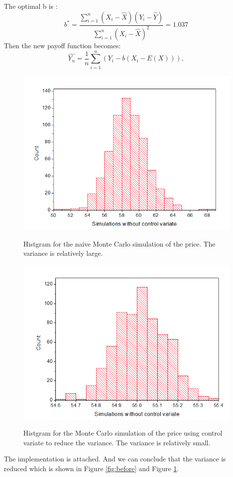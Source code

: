 \documentclass{report}
\begin{document}
The optimal b is : 
$$b^*=\frac{\sum_{i=1}^{n}(X_i-\hat{X}) (Y_i-\hat{Y}) }{\sum_{i=1}^{n}(X_i-\hat{X})^2} = 1.037 $$
Then the new payoff function becomes: 
$$\hat{Y_n}=\frac{1}{n}\sum_{i=1}^{n}(Y_i-b(X_i-E(X))), $$

\begin{figure} \centering
\includegraphics[width=\textwidth]{before}\label{fig:before}
\caption{Histgram for the naive Monte Carlo simulation of the price. The variance is relatively large.}  
\includegraphics[width=\textwidth]{after}\label{fig:after}
\caption{Histgram for the Monte Carlo simulation of the price using control variate to reduce the variance. The variance is relatively small.}  
\end{figure}
The implementation is attached. And we can conclude that the variance is reduced which is shown in Figure \ref{fig:before} and Figure \ref{fig:after}. 
\end{document}
